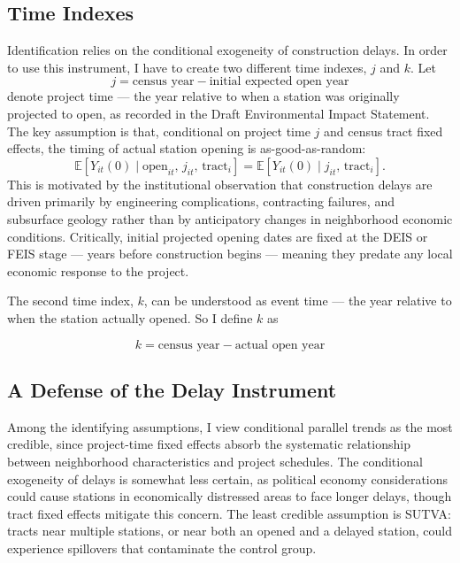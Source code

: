 \documentclass[12pt]{article}
\begin{document}
\subsection{Time Indexes}\label{subsec:time_index}
Identification relies on the conditional exogeneity of construction delays. In order to use this instrument, I have to create two different time indexes, $j$ and $k$. Let 
\begin{equation}\label{eq:proj_time}
    j = \text{census year} - \text{initial expected open year}
\end{equation} 
denote project time --- the year relative to when a station was originally projected to open, as recorded in the Draft Environmental Impact Statement. The key assumption is that, conditional on project time $j$ and census tract fixed effects, the timing of actual station opening is as-good-as-random:
$$\mathbb{E}[Y_{it}(0) \mid \text{open}_{it},\, j_{it},\, \text{tract}_i] = \mathbb{E}[Y_{it}(0) \mid j_{it},\, \text{tract}_i].$$
This is motivated by the institutional observation that construction delays are driven primarily by engineering complications, contracting failures, and subsurface geology rather than by anticipatory changes in neighborhood economic conditions. Critically, initial projected opening dates are fixed at the DEIS or FEIS stage --- years before construction begins --- meaning they predate any local economic response to the project.

The second time index, $k$, can be understood as event time --- the year relative to when the station actually opened. So I define $k$ as

\begin{equation}\label{eq:event_time}
    k = \text{census year}-\text{actual open year}
\end{equation}
\subsection{A Defense of the Delay Instrument}
Among the identifying assumptions, I view conditional parallel trends as the most credible, since project-time fixed effects absorb the systematic relationship between neighborhood characteristics and project schedules. The conditional exogeneity of delays is somewhat less certain, as political economy considerations could cause stations in economically distressed areas to face longer delays, though tract fixed effects mitigate this concern. The least credible assumption is SUTVA: tracts near multiple stations, or near both an opened and a delayed station, could experience spillovers that contaminate the control group.
\end{document}
